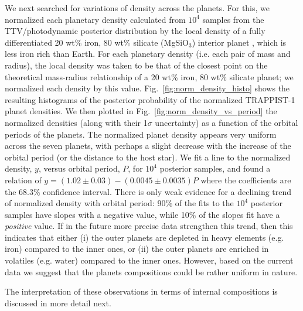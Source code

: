 \documentclass[twocolumn]{aastex63}
\begin{document}
We next searched for variations of density across the planets. For this, we normalized each planetary density calculated from $10^4$ samples from the TTV/photodynamic posterior distribution by the local density of a fully differentiated 20 wt\% iron, 80 wt\% silicate (MgSiO$_3$) interior planet \citep{Zeng2016}, which is less iron rich than Earth.  For each planetary density (i.e. each pair of mass and radius), the local density was taken to be that of the closest point on the theoretical mass-radius relationship of a 20 wt\% iron, 80 wt\% silicate planet;  we normalized each density by this value. Fig.~\ref{fig:norm_density_histo} shows the resulting histograms of the posterior probability of the normalized TRAPPIST-1 planet densities. We then plotted in Fig.~\ref{fig:norm_density_vs_period} the normalized densities (along with their 1$\sigma$ uncertainty) as a function of the orbital periods of the planets.  The normalized planet density appears very uniform across the seven planets, with perhaps a slight decrease with the increase of the orbital period (or the distance to the host star).  We fit a line to the normalized density, $y$, versus orbital period, $P$, for $10^4$ posterior samples, and found a relation of $y=(1.02\pm 0.03) - (0.0045\pm 0.0035)P$ where the
coefficients are the 68.3\% confidence interval. There is only weak evidence for a declining trend of normalized density with orbital period: 90\% of the fits to the $10^4$ posterior samples have slopes with a negative value, while 10\% of the slopes fit have a \emph{positive} value.  If in the future more precise data strengthen this trend, then
this indicates that either (i) the outer planets are depleted in heavy elements (e.g. iron) compared to the inner ones, or (ii) the outer planets are enriched in volatiles (e.g. water) compared to the inner ones.  However, based on the current data we suggest that the planets compositions could be rather uniform in nature.

The interpretation of these observations in terms of internal compositions is discussed in more detail next.
\end{document}
